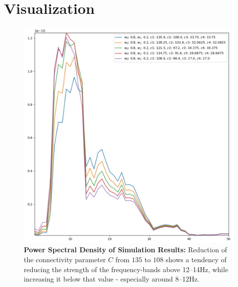 \section{Visualization}\label{sec:visualization}




\begin{figure}[H]
\includegraphics[width=15cm]{Figures/temp_sim_results}
\caption{\textbf{Power Spectral Density of Simulation Results:} Reduction of the connectivity parameter $C$
    from $135$ to $108$ shows a tendency of reducing the strength of the frequency-bands above 12--14Hz,
    while increasing it below that value - especially around 8--12Hz.}
\label{fig:sim_results1}
\end{figure}

